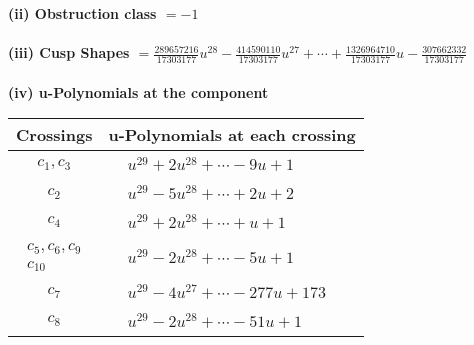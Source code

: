 \documentclass[1p]{elsarticle_modified}
\theoremstyle{definition}
\begin{document}
\flushleft \textbf{(ii) Obstruction class $= -1$}\\~\\
\flushleft \textbf{(iii) Cusp Shapes $= \frac{289657216}{17303177} u^{28}-\frac{414590110}{17303177} u^{27}+\cdots+\frac{1326964710}{17303177} u-\frac{307662332}{17303177}$}\\~\\
\newpage\renewcommand{\arraystretch}{1}
\flushleft \textbf{(iv) u-Polynomials at the component}\newline \\
\begin{tabular}{m{50pt}|m{274pt}}
Crossings & \hspace{64pt}u-Polynomials at each crossing \\
\hline $$\begin{aligned}c_{1},c_{3}\end{aligned}$$&$\begin{aligned}
&u^{29}+2 u^{28}+\cdots-9 u+1
\end{aligned}$\\
\hline $$\begin{aligned}c_{2}\end{aligned}$$&$\begin{aligned}
&u^{29}-5 u^{28}+\cdots+2 u+2
\end{aligned}$\\
\hline $$\begin{aligned}c_{4}\end{aligned}$$&$\begin{aligned}
&u^{29}+2 u^{28}+\cdots+u+1
\end{aligned}$\\
\hline $$\begin{aligned}c_{5},c_{6},c_{9}\\c_{10}\end{aligned}$$&$\begin{aligned}
&u^{29}-2 u^{28}+\cdots-5 u+1
\end{aligned}$\\
\hline $$\begin{aligned}c_{7}\end{aligned}$$&$\begin{aligned}
&u^{29}-4 u^{27}+\cdots-277 u+173
\end{aligned}$\\
\hline $$\begin{aligned}c_{8}\end{aligned}$$&$\begin{aligned}
&u^{29}-2 u^{28}+\cdots-51 u+1
\end{aligned}$\\
\hline
\end{tabular}\\~\\
\end{document}
